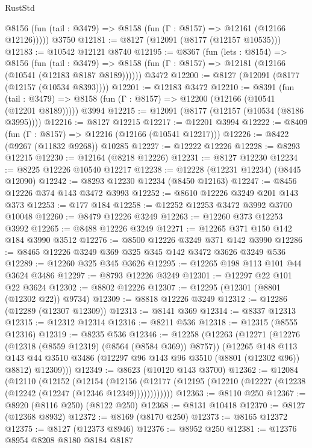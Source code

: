 \begin{lexlean}{RustStd}
\begin{coremodule}
      @8156 (fun (tail : @3479) => @8158 (fun (Γ : @8157) => @12161 (@12166 @12126)))))
    @3750
@12181 := @8127 (@12091 (@8177 (@12157 @10535)))
@12183 := @10542 @12121 @8740
@12195 := @8367
    (fun (lets : @8154) =>
    @8156
      (fun (tail : @3479) =>
      @8158 (fun (Γ : @8157) => @12181 (@12166 (@10541 (@12183 @8187 @8189))))))
    @3472
@12200 := @8127 (@12091 (@8177 (@12157 (@10534 @8393))))
@12201 := @12183 @3472
@12210 := @8391
    (fun (tail : @3479) => @8158 (fun (Γ : @8157) => @12200 (@12166 (@10541 (@12201 @8189)))))
    @3994
@12215 := @12091 (@8177 (@12157 (@10534 (@8186 @3995))))
@12216 := @8127 @12215
@12217 := @12201 @3994
@12222 := @8409 (fun (Γ : @8157) => @12216 (@12166 (@10541 @12217)))
@12226 := @8422 (@9267 (@11832 @9268)) @10285
@12227 := @12222 @12226
@12228 := @8293 @12215
@12230 := @12164 (@8218 @12226)
@12231 := @8127 @12230
@12234 := @8225 @12226 @10540 @12217
@12238 := @12228 (@12231 @12234) (@8445 @12090)
@12242 := @8293 @12230 @12234 (@8450 @12163)
@12247 := @8456 @12226 @374 @143 @3472 @3993
@12252 := @8610 @12226 @3249 @201 @143 @373
@12253 := @177 @184
@12258 := @12252 @12253 @3472 @3992 @3700 @10048
@12260 := @8479 @12226 @3249
@12263 := @12260 @373 @12253 @3992
@12265 := @8488 @12226 @3249
@12271 := @12265 @371 @150 @142 @184 @3990 @3512
@12276 := @8500 @12226 @3249 @371 @142 @3990
@12286 := @8465 @12226 @3249 @369 @325 @345 @142 @3472 @3626 @3249 @536
@12289 := @12260 @325 @345 @3626
@12295 := @12265 @198 @113 @101 @44 @3624 @3486
@12297 := @8793 @12226 @3249
@12301 := @12297 @22 @101 @22 @3624
@12302 := @8802 @12226
@12307 := @12295 (@12301 (@8801 (@12302 @22)) @9734)
@12309 := @8818 @12226 @3249
@12312 := @12286 (@12289 (@12307 @12309))
@12313 := @8141 @369
@12314 := @8337 @12313
@12315 := @12312 @12314
@12316 := @8211 @536
@12318 := @12315 (@8555 @12316)
@12319 := @8235 @536
@12346 := @12258
    (@12263
      (@12271
        (@12276 (@12318 (@8559 @12319) (@8564 (@8584 @369)) @8757))
        (@12265
          @148
          @113
          @143
          @44
          @3510
          @3486
          (@12297 @96 @143 @96 @3510 (@8801 (@12302 @96)) @8812)
          @12309)))
@12349 := @8623 (@10120 @143 @3700)
@12362 := @12084
    (@12110
      (@12152
        (@12154
          (@12156 (@12177 (@12195 (@12210 (@12227 (@12238 (@12242 (@12247 (@12346 @12349))))))))))))
@12363 := @8110 @250
@12367 := @8920 (@8116 @250) (@8122 @250)
@12368 := @8131 @10418
@12370 := @8127 (@12368 @8932)
@12372 := @8169 (@8170 @250)
@12373 := @8165 @12372
@12375 := @8127 (@12373 @8946)
@12376 := @8952 @250
@12381 := @12376 @8954 @8208 @8180 @8184 @8187

\end{coremodule}
\end{lexlean}
